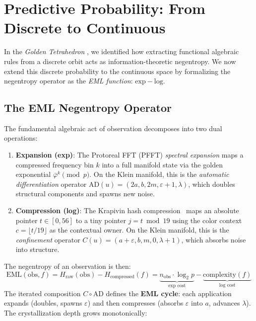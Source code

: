 \section{Predictive Probability: From Discrete to Continuous}

In the \textit{Golden Tetrahedron} \cite{golden_tetrahedron}, we identified how extracting functional algebraic rules from a discrete orbit acts as information-theoretic negentropy. We now extend this discrete probability to the continuous space by formalizing the negentropy operator as the \emph{EML function}: $\mathrm{exp} - \mathrm{log}$.

\subsection{The EML Negentropy Operator}

The fundamental algebraic act of observation decomposes into two dual operations:

\begin{enumerate}
    \item \textbf{Expansion (exp)}: The Protoreal FFT (PFFT) \emph{spectral expansion} maps a compressed frequency bin $k$ into a full manifold state via the golden exponential $\bar\varphi^k \pmod{p}$. On the Klein manifold, this is the \emph{automatic differentiation} operator $\mathrm{AD}(u) = (2a, b, 2m, \varepsilon + 1, \lambda)$, which doubles structural components and spawns new noise.
    \item \textbf{Compression (log)}: The Krapivin hash compression~\cite{krapivin2025optimal} maps an absolute pointer $t \in [0, 56]$ to a tiny pointer $j = t \bmod 19$ using the color context $c = \lfloor t/19 \rfloor$ as the contextual owner. On the Klein manifold, this is the \emph{confinement} operator $C(u) = (a + \varepsilon, b, m, 0, \lambda + 1)$, which absorbs noise into structure.
\end{enumerate}

The negentropy of an observation is then:
\begin{equation}
    \mathrm{EML}(\mathrm{obs}, f) = H_{\mathrm{raw}}(\mathrm{obs}) - H_{\mathrm{compressed}}(f) = \underbrace{n_{\mathrm{obs}} \cdot \log_2 p}_{\text{exp cost}} - \underbrace{\text{complexity}(f)}_{\text{log cost}}
\end{equation}
The iterated composition $C \circ \mathrm{AD}$ defines the \textbf{EML cycle}: each application expands (doubles, spawns $\varepsilon$) and then compresses (absorbs $\varepsilon$ into $a$, advances $\lambda$). The crystallization depth grows monotonically:

